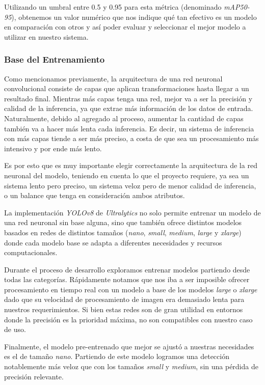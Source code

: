 \documentclass[a4paper]{article}
\begin{document}
Utilizando un umbral entre 0.5 y 0.95 para esta métrica (denominado \textit{mAP50-95}), obtenemos un valor numérico que nos indique qué tan efectivo es un modelo en comparación con otros y así poder evaluar y seleccionar el mejor modelo a utilizar en nuestro sistema.

\subsubsection{Base del Entrenamiento}

Como mencionamos previamente, la arquitectura de una red neuronal convolucional consiste de capas que aplican transformaciones hasta llegar a un resultado final. Mientras más capas tenga una red, mejor va a ser la precisión y calidad de la inferencia, ya que extrae más información de los datos de entrada. Naturalmente, debido al agregado al proceso, aumentar la cantidad de capas también va a hacer más lenta cada inferencia. Es decir, un sistema de inferencia con más capas tiende a ser más preciso, a costa de que sea un procesamiento más intensivo y por ende más lento.

Es por esto que es muy importante elegir correctamente la arquitectura de la red neuronal del modelo, teniendo en cuenta lo que el proyecto requiere, ya sea un sistema lento pero preciso, un sistema veloz pero de menor calidad de inferencia, o un balance que tenga en consideración ambos atributos. \medskip

La implementación \textit{YOLOv8} de \textit{Ultralytics} no solo permite entrenar un modelo de una red neuronal sin base alguna, sino que también ofrece distintos modelos basados en redes de distintos tamaños (\textit{nano}, \textit{small}, \textit{medium}, \textit{large} y \textit{xlarge}) donde cada modelo base se adapta a diferentes necesidades y recursos computacionales.

Durante el proceso de desarrollo exploramos entrenar modelos partiendo desde todas las categorías. Rápidamente notamos que nos iba a ser imposible ofrecer procesamiento en tiempo real con un modelo a base de los modelos \textit{large} o \textit{xlarge} dado que su velocidad de procesamiento de imagen era demasiado lenta para nuestros requerimientos. Si bien estas redes son de gran utilidad en entornos donde la precisión es la prioridad máxima, no son compatibles con nuestro caso de uso.

Finalmente, el modelo pre-entrenado que mejor se ajustó a nuestras necesidades es el de tamaño \textit{nano}. Partiendo de este modelo logramos una detección notablemente más veloz que con los tamaños \textit{small} y \textit{medium}, sin una pérdida de precisión relevante.
\end{document}
